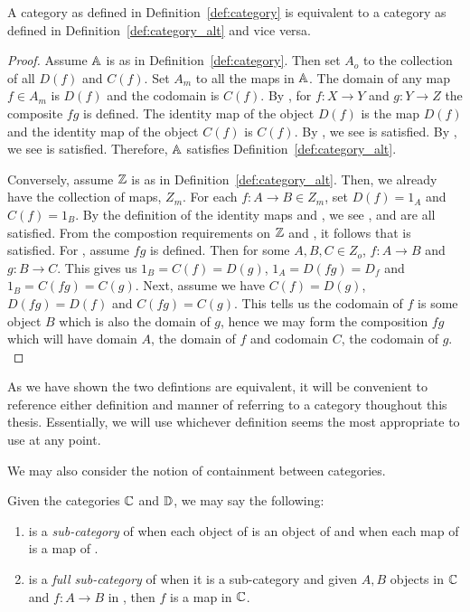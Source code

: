 \begin{lemma}\label{lem:category_is_category_alt}
  A category as defined in Definition~\ref{def:category} is equivalent to a category as defined
  in Definition~\ref{def:category_alt} and vice versa.
\end{lemma}
\begin{proof}
  Assume $\mathbb{A}$ is as in Definition~\ref{def:category}. Then set $A_o$ to the collection of all
  $D(f)$ and $C(f)$. Set $A_m$ to all the maps in $\mathbb{A}$. The domain of any map $f \in A_m$ is $D(f)$
  and the codomain is $C(f)$. By \catthree, for $f:X\to Y$ and $g:Y \to Z$ the composite $fg$ is
  defined. The identity map of the object $D(f)$ is the map $D(f)$ and the identity map of the
  object $C(f)$ is $C(f)$. By \catfive, we see  is satisfied. By \catfour, we see
   is satisfied. Therefore, $\mathbb{A}$ satisfies Definition~\ref{def:category_alt}.

  Conversely, assume $\mathbb{Z}$ is as in Definition~\ref{def:category_alt}. Then, we already have the
  collection of maps, $Z_m$. For each $f : A \to B \in Z_m$, set $D(f) = 1_A$ and $C(f) = 1_B$. By
  the definition of the identity maps and , we see \catone, \cattwo and \catfive are
  all satisfied. From the compostion requirements on $\mathbb{Z}$ and , it follows that
  \catfour is satisfied. For \catthree, assume $f g$ is defined. Then for some $A,B,C \in Z_o$,
  $f:A \to B$ and $g:B \to C$. This gives us $1_B = C(f) = D(g)$, $1_A = D(f g) = D_f$ and $1_B =
  C(f g) = C(g)$. Next, assume we have $C(f) = D(g)$, $D(f g) = D(f)$ and $C(f g) = C(g)$. This
  tells us the codomain of $f$ is some object $B$ which is also the domain of $g$, hence we may
  form the composition $f g$ which will have domain $A$, the domain of $f$ and codomain $C$, the
  codomain of $g.$
\end{proof}

As we have shown the two defintions are equivalent, it will be convenient to reference either
definition and manner of referring to a category thoughout this thesis. Essentially, we will use
whichever definition seems the most appropriate to use at any point.

We may also consider the notion of containment between categories.

\begin{definition}\label{def:subcategories}
  Given the categories $\mathbb{C}$ and $\mathbb{D}$, we may say the following:
  \begin{enumerate}[{(}i{)}]
    \item \C is a \emph{sub-category} of \D when each object of \C is an object of \D and when each map
    of \C is a map of \D.
    \item \C is a \emph{full sub-category} of \D when it is a sub-category and given $A, B$ objects
      in $\mathbb{C}$ and $f:A \to B$ in \D, then $f$ is a map in $\mathbb{C}$.
  \end{enumerate}
\end{definition}

